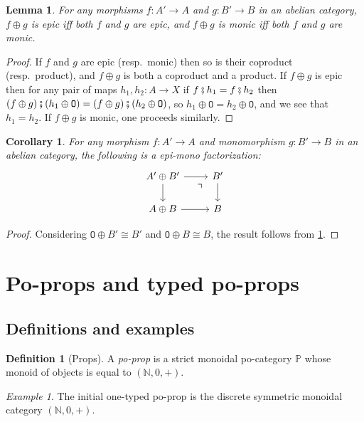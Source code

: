 \documentclass[11pt, oneside, article]{memoir}
\theoremstyle{plain}
\newtheorem{corollary}[theorem]{Corollary}
\newtheorem{lemma}[theorem]{Lemma}
\theoremstyle{definition}
\newtheorem{definition}[theorem]{Definition}
\theoremstyle{remark}
\newtheorem{example}[theorem]{Example}
\newcommand{\const}[1]{\mathtt{#1}}%
\newcommand{\nn}{\mathbb{N}}
\newcommand{\pp}{\mathbb{P}}
\newcommand{\cp}{\mathbin{\fatsemi}}
\newcommand{\zero}{\const{O}}
\begin{document}
\begin{lemma}\label{lemma.product_epimono}
For any morphisms $f\colon A'\to A$ and $g\colon B'\to B$ in an abelian category, $f\oplus g$ is epic iff both $f$ and $g$ are epic, and $f\oplus g$ is monic iff both $f$ and $g$ are monic.
\end{lemma}
\begin{proof}
If $f$ and $g$ are epic (resp.\ monic) then so is their coproduct (resp.\ product), and $f\oplus g$ is both a coproduct and a product. If $f\oplus g$ is epic then for any pair of maps $h_1,h_2\colon A\to X$ if $f\cp h_1=f\cp h_2$ then $(f\oplus g)\cp(h_1\oplus \zero)=(f\oplus g)\cp(h_2\oplus \zero)$, so $h_1\oplus \zero=h_2\oplus \zero$, and we see that $h_1=h_2$. If $f\oplus g$ is monic, one proceeds similarly.
\end{proof}

\begin{corollary}\label{cor.epimono}
For any morphism $f\colon A'\to A$ and monomorphism $g\colon B'\to B$ in an abelian category, the following is a epi-mono factorization:
\[
\begin{tikzcd}
	A'\oplus B'\ar[r]\ar[d]&
	B'\ar[d]\ar[dl, phantom, near start, "\urcorner"]\\
	A\oplus B\ar[r]&
	B
\end{tikzcd}
\]
\end{corollary}
\begin{proof}
Considering $\zero\oplus B'\cong B'$ and $\zero\oplus B\cong B$, the result follows from \cref{lemma.product_epimono}.
\end{proof}

\section{Po-props and typed po-props}

\subsection{Definitions and examples}

\begin{definition}[Props]\label{def.props}
A \emph{po-prop} is a strict monoidal po-category $\pp$ whose monoid of objects is equal to $(\nn,0,+)$. 
\end{definition}

\begin{example}\label{ex.nat_prop}
The initial one-typed po-prop is the discrete symmetric monoidal category $(\nn,0,+)$.
\end{example}
\end{document}
